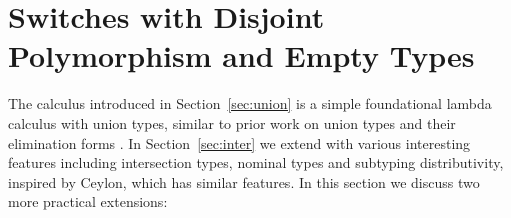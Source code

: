 








\section{Switches with Disjoint Polymorphism and Empty Types}
\label{sec:poly}

The calculus introduced in Section~\ref{sec:union} is
a simple foundational lambda calculus with
union types, similar to prior work on union
types and their elimination forms
\citep{benzaken2003cduce,dunfield2014elaborating,castagna:settheoretic}.
In Section~\ref{sec:inter} we extend \name with various interesting
features including intersection types, nominal types and
subtyping distributivity, inspired by Ceylon, which has similar features.
In this section we discuss two more practical extensions:

